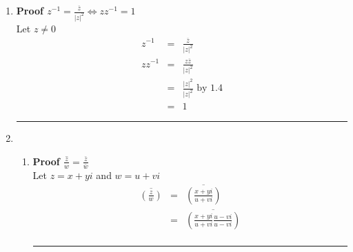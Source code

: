 \documentclass{article}%
\newcommand\abs[1]{\left|#1\right|}
\newenvironment{proof}[1][]{\begin{samepage}\textbf{Proof #1} }{\rule{0.5em}{0.5em} \end{samepage}}
\begin{document}
\begin{enumerate}
\begin{enumerate}[label*=\arabic*.]
\begin{enumerate}[label=\alph*]
\begin{proof}[$\abs{zw}=\abs{z}\abs{w}$]
            \end{proof}
            \item
            \begin{proof}[$\abs{z}=\abs{\overline{z}}$]
                \\ Let $z=x+yi$
                \begin{eqnarray*}
                    \abs{z}&=&\abs{x+yi} \\
                           &=&\sqrt{x^2+y^2} \\
                    \abs{\overline{z}}&=&\abs{\overline{x+yi}} \\
                                      &=&\abs{x-yi} \\
                                      &=&\sqrt{x^2+y^2} \\
                    \abs{z}&=&\abs{\overline{z}} 
                \end{eqnarray*}
            \end{proof}
        \end{enumerate}
        \item %
        \begin{proof}[$z^{-1}=\frac{\overline{z}}{\abs{z}^2} \Leftrightarrow z z^{-1}=1$]
            \\ Let $z\neq0$
            \begin{eqnarray*}
                z^{-1}&=&\frac{\overline{z}}{\abs{z}^2} \\
                zz^{-1}&=&\frac{z\overline{z}}{\abs{z}^2} \\
                       &=&\frac{\abs{z}^2}{\abs{z}^2} \text{ by 1.4} \\
                       &=&1
            \end{eqnarray*}
        \end{proof}
        \item %
        \begin{enumerate}[label=\alph*]
            \item %
            \begin{proof}[$\overline{\frac{z}{w}}=\frac{\bar{z}}{\bar{w}}$]
                \\ Let $z=x+yi$ and $w=u+vi$
                \begin{eqnarray*}
                    \overline{(\frac{z}{w})}&=&\overline{(\frac{x+yi}{u+vi})} \\
                                            &=&\overline{(\frac{x+yi}{u+vi}\frac{u-vi}{u-vi})} \\

\end{eqnarray*}
\end{proof}
\end{enumerate}
\end{enumerate}
\end{enumerate}
\end{document}
